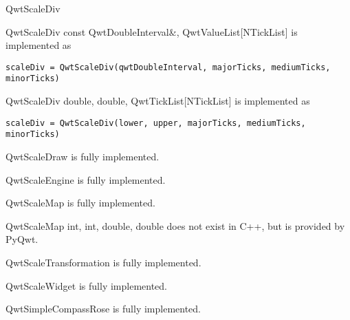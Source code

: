 \documentclass{manual}
\begin{document}
\begin{classdesc*}{QwtScaleDiv}

  \begin{cfuncdesc}{}
    {QwtScaleDiv}{
      const QwtDoubleInterval\&,
      QwtValueList[NTickList]}
    is implemented as
    \begin{verbatim}
scaleDiv = QwtScaleDiv(qwtDoubleInterval, majorTicks, mediumTicks, minorTicks)
    \end{verbatim}
  \end{cfuncdesc}

  \begin{cfuncdesc}{}
    {QwtScaleDiv}{
      double,
      double,
      QwtTickList[NTickList]}
    is implemented as
    \begin{verbatim}
scaleDiv = QwtScaleDiv(lower, upper, majorTicks, mediumTicks, minorTicks)
    \end{verbatim}
  \end{cfuncdesc}

\end{classdesc*}

\begin{classdesc*}{QwtScaleDraw}
  is fully implemented.
\end{classdesc*}

\begin{classdesc*}{QwtScaleEngine}
  is fully implemented.
\end{classdesc*}

\begin{classdesc*}{QwtScaleMap}
  is fully implemented.

  \begin{cfuncdesc}{}
    {QwtScaleMap}{
      int,
      int,
      double,
      double}
    does not exist in C++, but is provided by PyQwt. 
  \end{cfuncdesc}
\end{classdesc*}

\begin{classdesc*}{QwtScaleTransformation}
  is fully implemented.
\end{classdesc*}

\begin{classdesc*}{QwtScaleWidget}
  is fully implemented.
\end{classdesc*}

\begin{classdesc*}{QwtSimpleCompassRose}
  is fully implemented.
\end{classdesc*}
\end{document}
